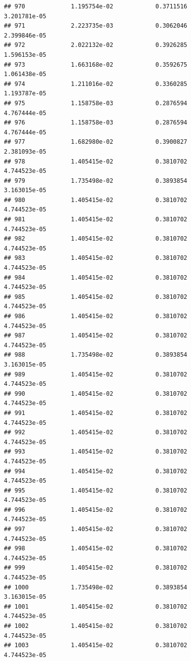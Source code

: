 \documentclass[
]{article}
\begin{document}
\begin{verbatim}
## 970             1.195754e-02            0.3711516            3.201781e-05
## 971             2.223735e-03            0.3062046            2.399846e-05
## 972             2.022132e-02            0.3926285            1.596153e-05
## 973             1.663168e-02            0.3592675            1.061438e-05
## 974             1.211016e-02            0.3360285            1.193787e-05
## 975             1.158758e-03            0.2876594            4.767444e-05
## 976             1.158758e-03            0.2876594            4.767444e-05
## 977             1.682980e-02            0.3900827            2.381093e-05
## 978             1.405415e-02            0.3810702            4.744523e-05
## 979             1.735498e-02            0.3893854            3.163015e-05
## 980             1.405415e-02            0.3810702            4.744523e-05
## 981             1.405415e-02            0.3810702            4.744523e-05
## 982             1.405415e-02            0.3810702            4.744523e-05
## 983             1.405415e-02            0.3810702            4.744523e-05
## 984             1.405415e-02            0.3810702            4.744523e-05
## 985             1.405415e-02            0.3810702            4.744523e-05
## 986             1.405415e-02            0.3810702            4.744523e-05
## 987             1.405415e-02            0.3810702            4.744523e-05
## 988             1.735498e-02            0.3893854            3.163015e-05
## 989             1.405415e-02            0.3810702            4.744523e-05
## 990             1.405415e-02            0.3810702            4.744523e-05
## 991             1.405415e-02            0.3810702            4.744523e-05
## 992             1.405415e-02            0.3810702            4.744523e-05
## 993             1.405415e-02            0.3810702            4.744523e-05
## 994             1.405415e-02            0.3810702            4.744523e-05
## 995             1.405415e-02            0.3810702            4.744523e-05
## 996             1.405415e-02            0.3810702            4.744523e-05
## 997             1.405415e-02            0.3810702            4.744523e-05
## 998             1.405415e-02            0.3810702            4.744523e-05
## 999             1.405415e-02            0.3810702            4.744523e-05
## 1000            1.735498e-02            0.3893854            3.163015e-05
## 1001            1.405415e-02            0.3810702            4.744523e-05
## 1002            1.405415e-02            0.3810702            4.744523e-05
## 1003            1.405415e-02            0.3810702            4.744523e-05

\end{verbatim}
\end{document}
